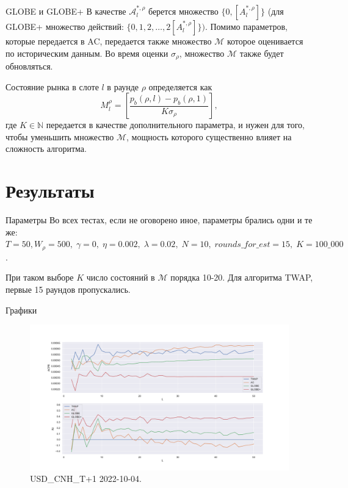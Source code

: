 \documentclass[aspectratio=169]{beamer}
\begin{document}
    \begin{frame}{GLOBE и GLOBE+}
        В качестве $\mathcal A_l^{*, \rho}$ берется множество $\{0, [A_l^{*,\rho}]\}$ (для GLOBE+ множество действий: $\{0, 1, 2, \ldots, 2 [A_l^{*,\rho}] \} )$. Помимо параметров, которые передается в AC, передается также множество $\mathcal M$ которое оценивается по историческим данным. Во время оценки $\sigma_\rho$, множество $\mathcal M$ также будет обновляться. 
    
        Состояние рынка в слоте $l$ в раунде $\rho$ определяется как 
        \begin{equation*}
            M_l^\rho = \left[\frac {p_b(\rho, l) - p_b(\rho, 1)}{K\sigma_\rho} \right],
        \end{equation*}
        где $K \in \mathbb N$ передается в качестве дополнительного параметра, и нужен для того, чтобы уменьшить множество $\mathcal M$, мощность которого существенно влияет на сложность алгоритма.

    \end{frame}


    \section{Результаты}

    \begin{frame}{Параметры}
        Во всех тестах, если не оговорено иное, параметры брались одни и те же: $T = 50, W_\rho = 500, \; \gamma = 0, \; \eta = 0.002, \; \lambda = 0.02, \; N = 10, \; rounds\_for\_est = 15, \; K = 100\_000$. 

        При таком выборе $K$ число состояний в $\mathcal M$ порядка 10-20. Для алгоритма TWAP, первые 15 раундов пропускались. 
        
    \end{frame}
    
    \begin{frame}{Графики}
    
        \begin{figure}  
            \centering
            \includegraphics[width=0.83\linewidth]{USD_CNH_T+1 2022-10-04 T = 50 W = 500}
            \caption{USD\_CNH\_T+1 2022-10-04. }
        \end{figure}

    \end{frame}
\end{document}
